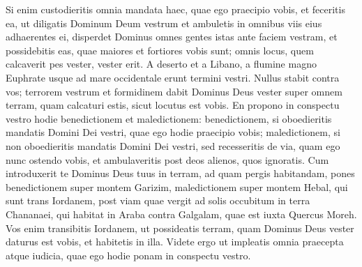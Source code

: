 \begin{biblechapter}
\begin{biblechapter}
\begin{biblechapter}
\begin{biblechapter}
\begin{biblechapter}
\begin{biblechapter}
\begin{biblechapter}
\begin{biblechapter}
\begin{biblechapter}
\begin{biblechapter}
\begin{biblechapter}
 \verse Si enim custodieritis omnia mandata haec, quae ego praecipio vobis, et feceritis ea, ut diligatis Dominum Deum vestrum et ambuletis in omnibus viis eius adhaerentes ei, 
\verse disperdet Dominus omnes gentes istas ante faciem vestram, et possidebitis eas, quae maiores et fortiores vobis sunt; 
\verse omnis locus, quem calcaverit pes vester, vester erit. A deserto et a Libano, a flumine magno Euphrate usque ad mare occidentale erunt termini vestri. 
\verse Nullus stabit contra vos; terrorem vestrum et formidinem dabit Dominus Deus vester super omnem terram, quam calcaturi estis, sicut locutus est vobis.
 \verse En propono in conspectu vestro hodie benedictionem et maledictionem: 
\verse benedictionem, si oboedieritis mandatis Domini Dei vestri, quae ego hodie praecipio vobis; 
\verse maledictionem, si non oboedieritis mandatis Domini Dei vestri, sed recesseritis de via, quam ego nunc ostendo vobis, et ambulaveritis post deos alienos, quos ignoratis. 
\verse Cum introduxerit te Dominus Deus tuus in terram, ad quam pergis habitandam, pones benedictionem super montem Garizim, maledictionem super montem Hebal, 
\verse qui sunt trans Iordanem, post viam quae vergit ad solis occubitum in terra Chananaei, qui habitat in Araba contra Galgalam, quae est iuxta Quercus Moreh. 
\verse Vos enim transibitis Iordanem, ut possideatis terram, quam Dominus Deus vester daturus est vobis, et habitetis in illa. 
\verse Videte ergo ut impleatis omnia praecepta atque iudicia, quae ego hodie ponam in conspectu vestro.
 

\end{biblechapter}
\end{biblechapter}
\end{biblechapter}
\end{biblechapter}
\end{biblechapter}
\end{biblechapter}
\end{biblechapter}
\end{biblechapter}
\end{biblechapter}
\end{biblechapter}
\end{biblechapter}
